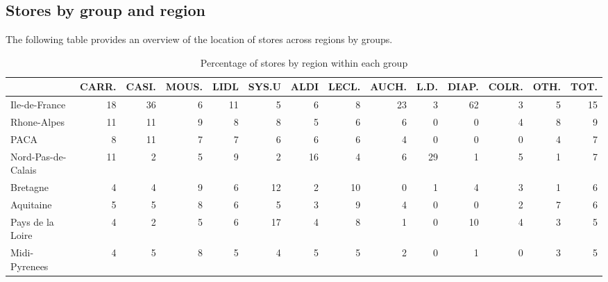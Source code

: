 \documentclass[11pt]{article}
\begin{document}
\subsection{Stores by group and region}

The following table provides an overview of the location of stores across regions by groups.

\begin{table}[H]
\caption{Percentage of stores by region within each group}
\footnotesize
\setlength{\tabcolsep}{2pt}

\begin{tabular}{lrrrrrrrrrrrrr}
\toprule
{} &      CARR. &      CASI. &      MOUS. &       LIDL &      SYS.U &       ALDI &      LECL. &      AUCH. &       L.D. &      DIAP. &      COLR. &       OTH. &       TOT. \\
\midrule
Ile-de-France        &         18 &         36 &          6 &         11 &          5 &          6 &          8 &         23 &          3 &         62 &          3 &          5 &         15 \\
Rhone-Alpes          &         11 &         11 &          9 &          8 &          8 &          5 &          6 &          6 &          0 &          0 &          4 &          8 &          9 \\
PACA                 &          8 &         11 &          7 &          7 &          6 &          6 &          6 &          4 &          0 &          0 &          0 &          4 &          7 \\
Nord-Pas-de-Calais   &         11 &          2 &          5 &          9 &          2 &         16 &          4 &          6 &         29 &          1 &          5 &          1 &          7 \\
Bretagne             &          4 &          4 &          9 &          6 &         12 &          2 &         10 &          0 &          1 &          4 &          3 &          1 &          6 \\
Aquitaine            &          5 &          5 &          8 &          6 &          5 &          3 &          9 &          4 &          0 &          0 &          2 &          7 &          6 \\
Pays de la Loire     &          4 &          2 &          5 &          6 &         17 &          4 &          8 &          1 &          0 &         10 &          4 &          3 &          5 \\
Midi-Pyrenees        &          4 &          5 &          8 &          5 &          4 &          5 &          5 &          2 &          0 &          1 &          0 &          3 &          5 \\

\end{tabular}
\end{table}
\end{document}
